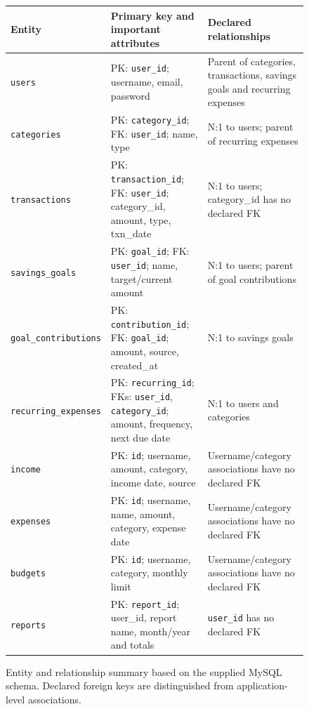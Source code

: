 \documentclass{tietreport}
\begin{document}
\begin{figure}[htbp]
\centering
\begin{center}
\small
\setlength{\tabcolsep}{4pt}
\renewcommand{\arraystretch}{1.25}
\begin{tabularx}{\textwidth}{|>{\raggedright\arraybackslash}p{}|X|>{\raggedright\arraybackslash}p{}|}
\hline
\textbf{Entity} & \textbf{Primary key and important attributes} & \textbf{Declared relationships}\\
\hline
\texttt{users} & PK: \texttt{user\_id}; username, email, password & Parent of categories, transactions, savings goals and recurring expenses\\
\hline
\texttt{categories} & PK: \texttt{category\_id}; FK: \texttt{user\_id}; name, type & N:1 to users; parent of recurring expenses\\
\hline
\texttt{transactions} & PK: \texttt{transaction\_id}; FK: \texttt{user\_id}; category\_id, amount, type, txn\_date & N:1 to users; category\_id has no declared FK\\
\hline
\texttt{savings\_goals} & PK: \texttt{goal\_id}; FK: \texttt{user\_id}; name, target/current amount & N:1 to users; parent of goal contributions\\
\hline
\texttt{goal\_contributions} & PK: \texttt{contribution\_id}; FK: \texttt{goal\_id}; amount, source, created\_at & N:1 to savings goals\\
\hline
\texttt{recurring\_expenses} & PK: \texttt{recurring\_id}; FKs: \texttt{user\_id}, \texttt{category\_id}; amount, frequency, next due date & N:1 to users and categories\\
\hline
\texttt{income} & PK: \texttt{id}; username, amount, category, income date, source & Username/category associations have no declared FK\\
\hline
\texttt{expenses} & PK: \texttt{id}; username, name, amount, category, expense date & Username/category associations have no declared FK\\
\hline
\texttt{budgets} & PK: \texttt{id}; username, category, monthly limit & Username/category associations have no declared FK\\
\hline
\texttt{reports} & PK: \texttt{report\_id}; user\_id, report name, month/year and totals & \texttt{user\_id} has no declared FK\\
\hline
\end{tabularx}
\end{center}
\caption{Entity and relationship summary based on the supplied MySQL schema.
Declared foreign keys are distinguished from application-level associations.}
\label{fig:er}
\end{figure}
\end{document}
